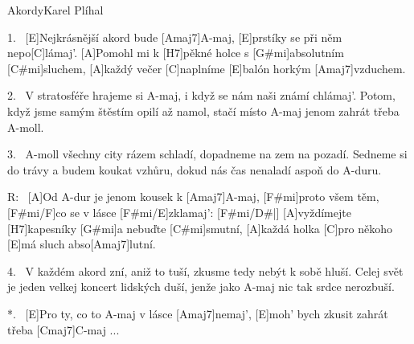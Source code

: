 \begin{song}{Akordy}{Karel Plíhal}

\begin{xverse}{1.~}
[\large E]Nejkrásnější akord bude [\large Amaj7]A-maj,
[\large E]prstíky se při něm nepo[\large C]lámaj'.
[\large A]Pomohl mi k [\large H7]pěkné holce s [\large G#mi]absolutním [\large C#mi]sluchem,
[\large A]každý večer [\large C]naplníme [\large E]balón horkým [\large Amaj7]vzduchem.
\end{xverse}

\begin{xverse}{2.~}
V stratosféře hrajeme si A-maj,
i když se nám naši známí chlámaj'.
Potom, když jsme samým štěstím opilí až namol,
stačí místo A-maj jenom zahrát třeba A-moll.
\end{xverse}

\begin{xverse}{3.~}
A-moll všechny city rázem schladí,
dopadneme na zem na pozadí.
Sedneme si do trávy a budem koukat vzhůru,
dokud nás čas nenaladí aspoň do A-duru.
\end{xverse}

\begin{xverse}{R:~}
[\large A]Od A-dur je jenom kousek k [\large Amaj7]A-maj,
[\large F#mi]proto všem těm, [\large F#mi/F]co se v lásce [\large F#mi/E]zklamaj': [\large F#mi/D#|]{}
[\large A]vyždímejte [\large H7]kapesníky [\large G#mi]a nebuďte [\large C#mi]smutní,
[\large A]každá holka [\large C]pro někoho [\large E]má sluch abso[\large Amaj7]lutní.
\end{xverse}

\begin{xverse}{4.~}
V každém akord zní, aniž to tuší,
zkusme tedy nebýt k sobě hluší.
Celej svět je jeden velkej koncert lidských duší,
jenže jako A-maj nic tak srdce nerozbuší.
\end{xverse}

\begin{xverse}{*.~}
[\large E]Pro ty, co to A-maj v lásce [\large Amaj7]nemaj',
[\large E]moh' bych zkusit zahrát třeba [\large Cmaj7]C-maj ...
\end{xverse}

\end{song}


